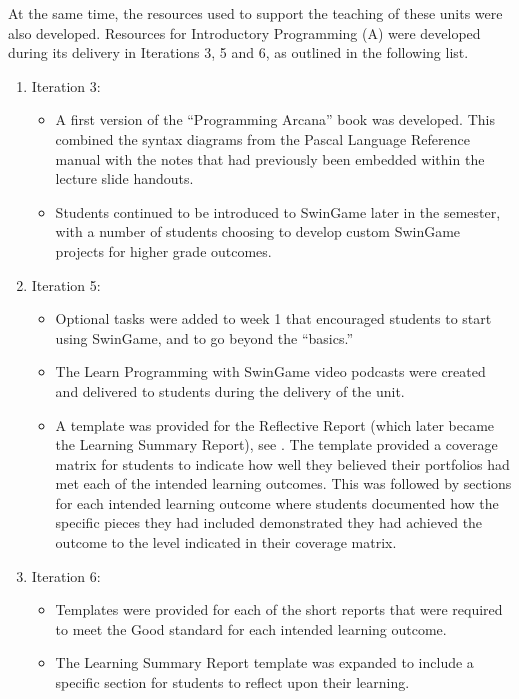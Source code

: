 At the same time, the resources used to support the teaching of these units were also developed. Resources for Introductory Programming (A) were developed during its delivery in Iterations 3, 5 and 6, as outlined in the following list.
\begin{enumerate}
  \item Iteration 3:
  \begin{itemize}[noitemsep,nolistsep]
    \item A first version of the ``Programming Arcana'' book was developed. This combined the syntax diagrams from the Pascal Language Reference manual \cite{FPC:2013lang} with the notes that had previously been embedded within the lecture slide handouts.
    \item Students continued to be introduced to SwinGame later in the semester, with a number of students choosing to develop custom SwinGame projects for higher grade outcomes. 
  \end{itemize}
  \item Iteration 5:
  \begin{itemize}[noitemsep,nolistsep]
    \item Optional tasks were added to week 1 that encouraged students to start using SwinGame, and to go beyond the ``basics.''
    \item The Learn Programming with SwinGame video podcasts were created and delivered to students during the delivery of the unit.
    \item A template was provided for the Reflective Report (which later became the Learning Summary Report), see . The template provided a coverage matrix for students to indicate how well they believed their portfolios had met each of the intended learning outcomes. This was followed by sections for each intended learning outcome where students documented how the specific pieces they had included demonstrated they had achieved the outcome to the level indicated in their coverage matrix.
  \end{itemize}
  \item Iteration 6:
  \begin{itemize}[noitemsep,nolistsep]
    \item Templates were provided for each of the short reports that were required to meet the Good standard for each intended learning outcome.
    \item The Learning Summary Report template was expanded to include a specific section for students to reflect upon their learning.
  \end{itemize}
\end{enumerate}

